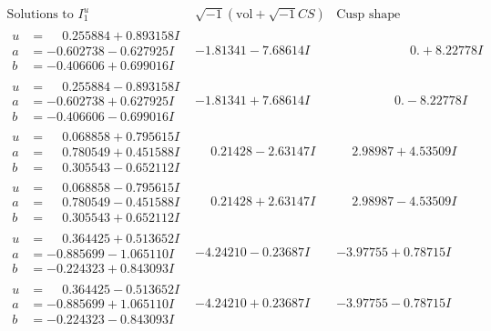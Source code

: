 \documentclass[1p]{elsarticle_modified}
\theoremstyle{definition}
\newcommand{\I}{\sqrt{-1}}
\begin{document}
$$\begin{array}{c|c|c}  
\text{Solutions to }I^u_{1}& \I (\text{vol} + \sqrt{-1}CS) & \text{Cusp shape}\\
 \hline 
\begin{aligned}
u &= \phantom{-}0.255884 + 0.893158 I \\
a &= -0.602738 - 0.627925 I \\
b &= -0.406606 + 0.699016 I\end{aligned}
 & -1.81341 - 7.68614 I & \phantom{-0.000000 -}0. + 8.22778 I \\ \hline\begin{aligned}
u &= \phantom{-}0.255884 - 0.893158 I \\
a &= -0.602738 + 0.627925 I \\
b &= -0.406606 - 0.699016 I\end{aligned}
 & -1.81341 + 7.68614 I & \phantom{-0.000000 } 0. - 8.22778 I \\ \hline\begin{aligned}
u &= \phantom{-}0.068858 + 0.795615 I \\
a &= \phantom{-}0.780549 + 0.451588 I \\
b &= \phantom{-}0.305543 - 0.652112 I\end{aligned}
 & \phantom{-}0.21428 - 2.63147 I & \phantom{-}2.98987 + 4.53509 I \\ \hline\begin{aligned}
u &= \phantom{-}0.068858 - 0.795615 I \\
a &= \phantom{-}0.780549 - 0.451588 I \\
b &= \phantom{-}0.305543 + 0.652112 I\end{aligned}
 & \phantom{-}0.21428 + 2.63147 I & \phantom{-}2.98987 - 4.53509 I \\ \hline\begin{aligned}
u &= \phantom{-}0.364425 + 0.513652 I \\
a &= -0.885699 - 1.065110 I \\
b &= -0.224323 + 0.843093 I\end{aligned}
 & -4.24210 - 0.23687 I & -3.97755 + 0.78715 I \\ \hline\begin{aligned}
u &= \phantom{-}0.364425 - 0.513652 I \\
a &= -0.885699 + 1.065110 I \\
b &= -0.224323 - 0.843093 I\end{aligned}
 & -4.24210 + 0.23687 I & -3.97755 - 0.78715 I \\ \hline\begin{aligned}

\end{aligned}
\end{array}$$
\end{document}
